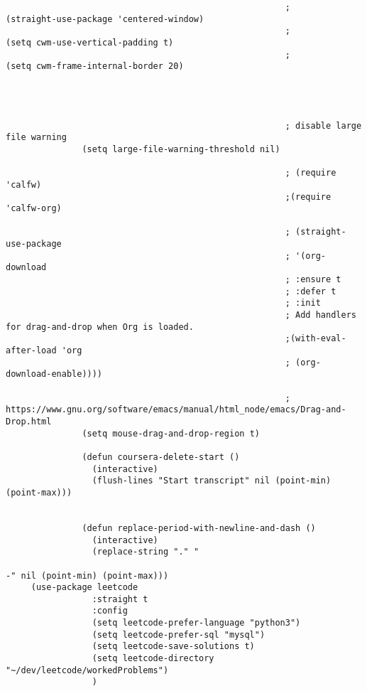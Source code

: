 \documentclass[11pt]{article}
\begin{document}
\begin{verbatim}
                                                       ;               (straight-use-package 'centered-window)
                                                       ;               (setq cwm-use-vertical-padding t)
                                                       ;               (setq cwm-frame-internal-border 20)




                                                       ; disable large file warning
               (setq large-file-warning-threshold nil)

                                                       ; (require 'calfw)
                                                       ;(require 'calfw-org)

                                                       ; (straight-use-package 
                                                       ; '(org-download
                                                       ; :ensure t
                                                       ; :defer t
                                                       ; :init
                                                       ; Add handlers for drag-and-drop when Org is loaded.
                                                       ;(with-eval-after-load 'org
                                                       ; (org-download-enable))))

                                                       ; https://www.gnu.org/software/emacs/manual/html_node/emacs/Drag-and-Drop.html
               (setq mouse-drag-and-drop-region t)

               (defun coursera-delete-start ()
                 (interactive)
                 (flush-lines "Start transcript" nil (point-min) (point-max)))


               (defun replace-period-with-newline-and-dash ()
                 (interactive)
                 (replace-string "." "
                                                                                                                                                                                                                                                                                                                                     -" nil (point-min) (point-max)))
     (use-package leetcode
                 :straight t
                 :config
                 (setq leetcode-prefer-language "python3")
                 (setq leetcode-prefer-sql "mysql")
                 (setq leetcode-save-solutions t)
                 (setq leetcode-directory "~/dev/leetcode/workedProblems")
                 )


\end{verbatim}
\end{document}
